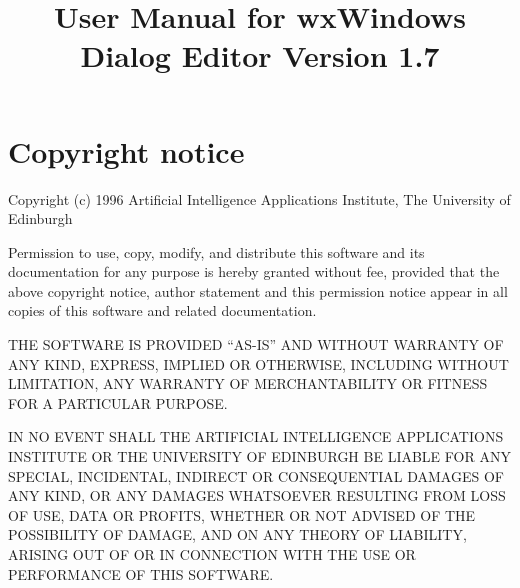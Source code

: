 
\parskip=10pt
\parindent=0pt
\title{User Manual for wxWindows Dialog Editor Version 1.7}
\makeindex

\maketitle
\pagestyle{fancyplain}

\setfooter{\thepage}{}{}{}{}{\thepage}%
\tableofcontents

\chapter*{Copyright notice}
%
\setfooter{\thepage}{}{}{}{}{\thepage}%

\begin{center}
Copyright (c) 1996 Artificial Intelligence Applications Institute,
The University of Edinburgh\\
\end{center}

Permission to use, copy, modify, and distribute this software and its
documentation for any purpose is hereby granted without fee, provided that the
above copyright notice, author statement and this permission notice appear in
all copies of this software and related documentation.

THE SOFTWARE IS PROVIDED ``AS-IS'' AND WITHOUT WARRANTY OF ANY KIND, EXPRESS,
IMPLIED OR OTHERWISE, INCLUDING WITHOUT LIMITATION, ANY WARRANTY OF
MERCHANTABILITY OR FITNESS FOR A PARTICULAR PURPOSE.

IN NO EVENT SHALL THE ARTIFICIAL INTELLIGENCE APPLICATIONS INSTITUTE OR THE
UNIVERSITY OF EDINBURGH BE LIABLE FOR ANY SPECIAL, INCIDENTAL, INDIRECT OR
CONSEQUENTIAL DAMAGES OF ANY KIND, OR ANY DAMAGES WHATSOEVER RESULTING FROM
LOSS OF USE, DATA OR PROFITS, WHETHER OR NOT ADVISED OF THE POSSIBILITY OF
DAMAGE, AND ON ANY THEORY OF LIABILITY, ARISING OUT OF OR IN CONNECTION WITH
THE USE OR PERFORMANCE OF THIS SOFTWARE.







\newpage

%
\setfooter{\thepage}{}{}{}{}{\thepage}%
\printindex

